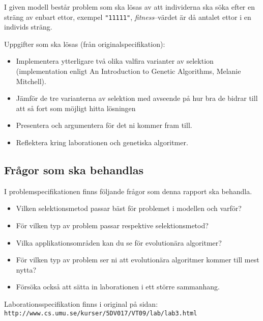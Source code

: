 \documentclass[titlepage, a4paper, 12pt]{article}
\begin{document}
I given modell består problem som ska lösas av att individerna ska
söka efter en sträng av enbart ettor, exempel \verb!"11111"!,
\textit{fitness}–värdet är då antalet ettor i en individs sträng.

Uppgifter som ska lösas (från originalspecifikation):
\begin{itemize}
\item Implementera ytterligare två olika valfira varianter av
  selektion (implementation enligt An Introduction to Genetic
  Algorithms, Melanie Mitchell).
\item Jämför de tre varianterna av selektion med avseende på hur bra
  de bidrar till att så fort som möjligt hitta lösningen
\item Presentera och argumentera för det ni kommer fram till.
\item Reflektera kring laborationen och genetiska algoritmer.
\end{itemize}



\subsection{Frågor som ska behandlas}
I problemspecifikationen finns följande frågor som denna rapport ska
behandla.

\begin{itemize}
\item Vilken selektionsmetod passar bäst för problemet i modellen och varför?
\item För vilken typ av problem passar respektive selektionsmetod?
\item Vilka applikationsområden kan du se för evolutionära algoritmer?
\item För vilken typ av problem ser ni att evolutionära algoritmer
  kommer till mest nytta?
\item Försöka också att sätta in laborationen i ett större sammanhang. 
\end{itemize}
Laborationsspecifikation finns i original på sidan:\\
\verb!http://www.cs.umu.se/kurser/5DV017/VT09/lab/lab3.html!
\end{document}
